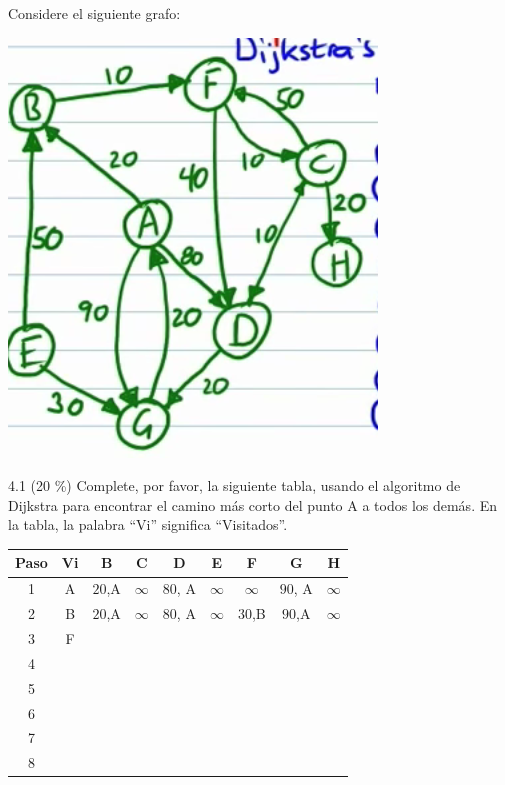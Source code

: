 \documentclass[twocolumn]{article}
\begin{document}
Considere el siguiente grafo:

\begin{center}
\includegraphics[scale=0.3]{dij.png}
\end{center}

4.1 (20 \%) Complete, por favor, la siguiente tabla, usando
el algoritmo de Dijkstra para encontrar el camino más corto
del punto A a todos los demás. En la tabla, la palabra ``Vi'' significa ``Visitados''.

{\footnotesize
\begin{center}
\begin{tabular}{| c | c | c | c | c | c | c | c | c |}
\hline
Paso  & Vi & B & C & D & E & F & G & H \\
\hline
1 &  A  & $20$,A  & $\infty$  & $80$, A  & $\infty$   & $\infty$  & $90$, A  & $\infty$  \\
\hline
2 &  B  & $20$,A  &  $\infty$  & $80$, A  & $\infty$  & $30$,B  & $90$,A   & $\infty$  \\
\hline
3 &  F &   &   &   &   &   &   &   \\
\hline
4 &   &   &   &   &   &   &   &   \\
\hline
5 &   &   &   &   &   &   &   &   \\
\hline
6 &   &   &   &   &   &   &   &   \\
\hline
7 &   &   &   &   &   &   &   &   \\ 
\hline
8 &   &   &   &   &   &   &   &   \\ 
\hline
\end{tabular}
\end{center}
}
\end{document}
